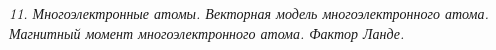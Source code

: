 \emph{11. Многоэлектронные атомы. Векторная модель многоэлектронного 
атома. Магнитный момент многоэлектронного атома. Фактор Ланде.}

\newpage
